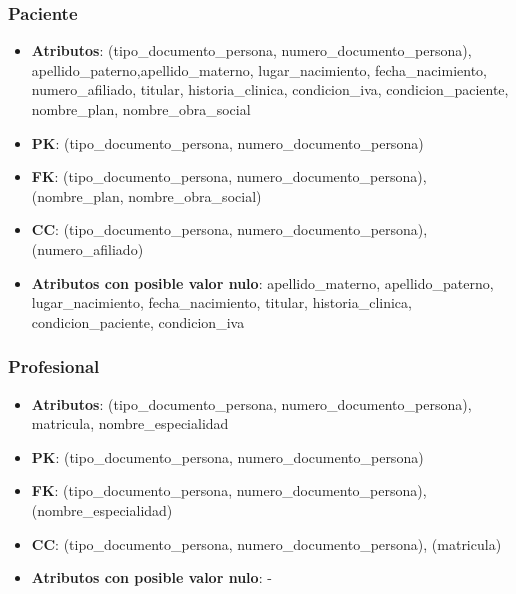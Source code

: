\documentclass[a4paper,11pt]{article}
\begin{document}
\subsubsection{\textbf{Paciente}}

\begin{itemize}

\item 
\textbf{Atributos}: (tipo\_documento\_persona, numero\_documento\_persona), apellido\_paterno,apellido\_materno, lugar\_nacimiento, fecha\_nacimiento,  numero\_afiliado, titular, historia\_clinica, condicion\_iva, condicion\_paciente, nombre\_plan, nombre\_obra\_social

\item 
\textbf{PK}: (tipo\_documento\_persona, numero\_documento\_persona)

\item
\textbf{FK}:  (tipo\_documento\_persona, numero\_documento\_persona), (nombre\_plan, nombre\_obra\_social)

\item 
\textbf{CC}: (tipo\_documento\_persona, numero\_documento\_persona), (numero\_afiliado)

\item 
\textbf{Atributos con posible valor nulo}:  apellido\_materno, apellido\_paterno, lugar\_nacimiento, fecha\_nacimiento, titular, historia\_clinica, condicion\_paciente, condicion\_iva

\end{itemize}
\subsubsection{\textbf{Profesional}}

\begin{itemize}

\item 
\textbf{Atributos}: (tipo\_documento\_persona, numero\_documento\_persona), matricula,  nombre\_especialidad

\item 
\textbf{PK}: (tipo\_documento\_persona, numero\_documento\_persona)

\item
\textbf{FK}: (tipo\_documento\_persona, numero\_documento\_persona), (nombre\_especialidad)

\item 
\textbf{CC}: (tipo\_documento\_persona, numero\_documento\_persona), (matricula)

\item 
\textbf{Atributos con posible valor nulo}: -

\end{itemize}
\end{document}
